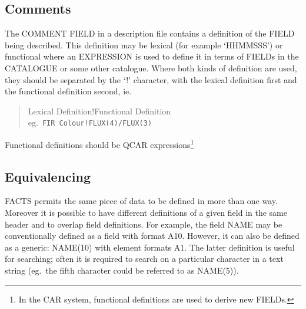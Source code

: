 \subsection {Comments}
The COMMENT FIELD in a description file contains a definition of the FIELD
being described.
This definition may be lexical (for example `HHMMSSS') or functional where an
EXPRESSION is used to define it in terms of FIELDs in the CATALOGUE or some
other catalogue.
Where both kinds of definition are used, they should be separated by the `!'
character, with the lexical definition first and the functional definition
second, ie.
\begin{quote}
	Lexical Definition!Functional Definition\\
	eg.\ {\tt FIR Colour!FLUX(4)/FLUX(3)}
\end{quote}
Functional definitions should be QCAR expressions\footnote
{In the CAR system, functional definitions are used to derive new FIELDs.}
\subsection {Equivalencing}
FACTS permits the same piece of data to be defined in more than one way.
Moreover it is possible to have different definitions of a given field in the
same header and to overlap field definitions.
For example, the field NAME may be conventionally defined as a field with format
A10.
However, it can also be defined as a generic: NAME(10) with element formats A1.
The latter definition is useful for searching; often it is required to search on
a particular character in a text string (eg.\ the fifth character could be
referred to as NAME(5)).
